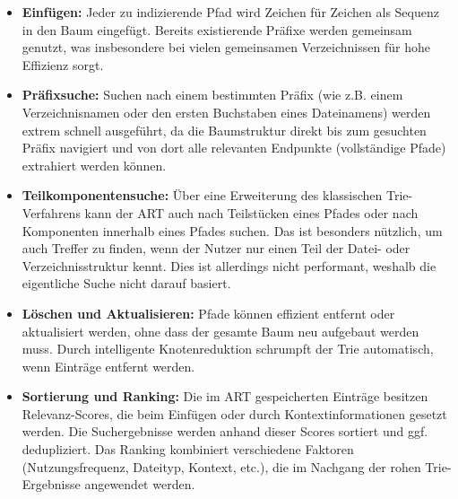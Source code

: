 \begin{itemize}
	\item \textbf{Einfügen:} Jeder zu indizierende Pfad wird Zeichen für Zeichen als Sequenz in den Baum eingefügt. Bereits existierende Präfixe werden gemeinsam genutzt, was insbesondere bei vielen gemeinsamen Verzeichnissen für hohe Effizienz sorgt.
	\item \textbf{Präfixsuche:} Suchen nach einem bestimmten Präfix (wie z.B. einem Verzeichnisnamen oder den ersten Buchstaben eines Dateinamens) werden extrem schnell ausgeführt, da die Baumstruktur direkt bis zum gesuchten Präfix navigiert und von dort alle relevanten Endpunkte (vollständige Pfade) extrahiert werden können.
	\item \textbf{Teilkomponentensuche:} Über eine Erweiterung des klassischen Trie-Verfahrens kann der ART auch nach Teilstücken eines Pfades oder nach Komponenten innerhalb eines Pfades suchen. Das ist besonders nützlich, um auch Treffer zu finden, wenn der Nutzer nur einen Teil der Datei- oder Verzeichnisstruktur kennt. Dies ist allerdings nicht performant, weshalb die eigentliche Suche nicht darauf basiert.
	\item \textbf{Löschen und Aktualisieren:} Pfade können effizient entfernt oder aktualisiert werden, ohne dass der gesamte Baum neu aufgebaut werden muss. Durch intelligente Knotenreduktion schrumpft der Trie automatisch, wenn Einträge entfernt werden.
	\item \textbf{Sortierung und Ranking:} Die im ART gespeicherten Einträge besitzen Relevanz-Scores, die beim Einfügen oder durch Kontextinformationen gesetzt werden. Die Suchergebnisse werden anhand dieser Scores sortiert und ggf. dedupliziert. Das Ranking kombiniert verschiedene Faktoren (Nutzungsfrequenz, Dateityp, Kontext, etc.), die im Nachgang der rohen Trie-Ergebnisse angewendet werden.
\end{itemize}

